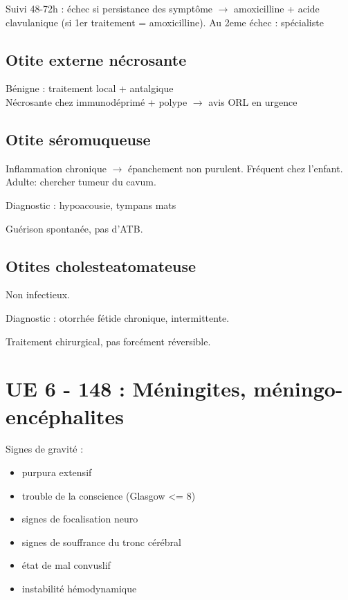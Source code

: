 \documentclass{article}
\begin{document}
Suivi 48-72h : échec si persistance des symptôme $\rightarrow$ amoxicilline +
acide clavulanique (si 1er traitement = amoxicilline). Au 2eme échec :
spécialiste

\subsection{Otite externe nécrosante}%
\label{sub:otite_externe_necrosante}

Bénigne : traitement local + antalgique\\
Nécrosante chez immunodéprimé + polype $\to$ avis ORL en urgence \skull

\subsection{Otite séromuqueuse}%
\label{sub:otite_seromuqueuse}
Inflammation chronique $\rightarrow$ épanchement non purulent. Fréquent chez
l'enfant. Adulte: chercher tumeur du cavum.

Diagnostic : hypoacousie, tympans mats

Guérison spontanée, pas d'ATB.

\subsection{Otites cholesteatomateuse}%
\label{sub:otites_choestatomateuse}
Non infectieux. 

Diagnostic : otorrhée fétide chronique, intermittente.

Traitement chirurgical, pas forcément réversible.


\section{UE 6 - 148 : Méningites, méningo-encéphalites}

Signes de gravité :

\begin{itemize}
\item purpura extensif
\item trouble de la conscience (Glasgow \textless{}= 8)
\item signes de focalisation neuro
\item signes de souffrance du tronc cérébral
\item état de mal convuslif
\item instabilité hémodynamique
\end{itemize}
\end{document}
